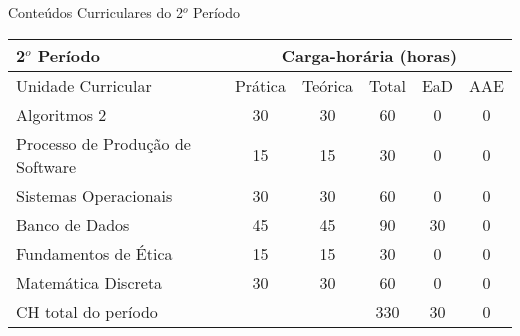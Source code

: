 \begin{quadro}[ht!]
\centering
\caption{Conteúdos Curriculares do 2$^o$ Período}\label{qua:periodo2}
\begin{tabular}{|p{8.0cm}|c|c|c|c|c|}
\hline
\rowcolor{blue1} 2$^o$ Período & \multicolumn{5}{|c|}{\centering Carga-horária (horas)} \\ \hline
\rowcolor{blue1} Unidade Curricular & Prática & Teórica & Total & EaD & AAE \\ \hline
Algoritmos 2 & 30 & 30 & 60 & 0	&	0 \\	\hline
Processo de Produção de Software & 15 & 15 & 30 & 0	&	0 \\	\hline
Sistemas Operacionais & 30 & 30 & 60 & 0	&	0 \\	\hline
Banco de Dados & 45 & 45 & 90 & 30	&	0 \\	\hline
Fundamentos de Ética & 15 & 15 & 30 & 0	&	0 \\	\hline
Matemática Discreta & 30 & 30 & 60 & 0	&	0 \\	\hline
CH total do período & \multicolumn{2}{p{3.3cm}|}{\cellcolor{blue1}} & 330 & 30	&	0 \\ \hline
\end{tabular} \end{quadro}